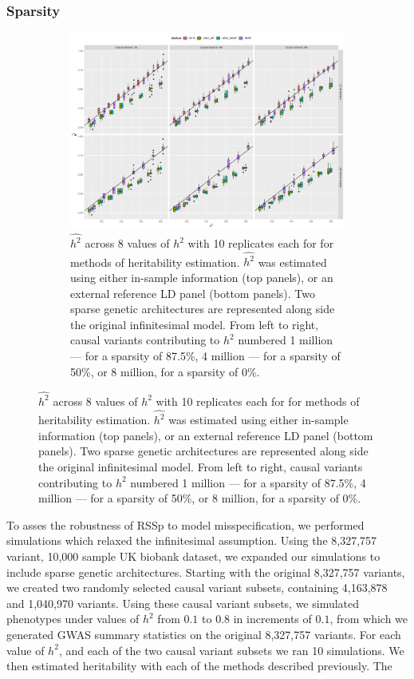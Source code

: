 \subsubsection{Sparsity}

  \begin{figure}
      \centering
  \begin{subfigure}[t]{\textwidth}
    \centering
    \includegraphics[width=.9\linewidth]{img/rssp_sparsity.png}
    \caption{$\hat{h^2}$ across 8 values of $h^2$ with 10 replicates each for for methods of heritability estimation. $\hat{h^2}$ was estimated using either in-sample information (top panels), or an external reference LD panel (bottom panels). Two sparse genetic architectures are represented along side the original infinitesimal model.  From left to right, causal variants contributing to $h^2$ numbered 1 million --- for a sparsity of 87.5\%, 4 million --- for a sparsity of 50\%, or 8 million, for a sparsity of 0\%.}\label{fig:rssp_sp_method_comparison}
  \end{subfigure}
\end{figure}


To asses the robustness of RSSp to model misspecification, we performed simulations which relaxed the infinitesimal assumption.  Using the 8,327,757 variant, 10,000 sample UK biobank dataset, we expanded our simulations to include sparse genetic architectures.  Starting with the original 8,327,757 variants, we created two randomly selected causal variant subsets, containing  4,163,878  and 1,040,970 variants.  Using these causal variant subsets, we simulated phenotypes under values of  $h^2$ from $0.1$ to $0.8$ in increments of $0.1$, from which we generated GWAS summary statistics on the original 8,327,757 variants.  For each value of $h^2$, and each of the two causal variant subsets we ran 10 simulations.  We then estimated heritability with each of the methods described previously.  The 

